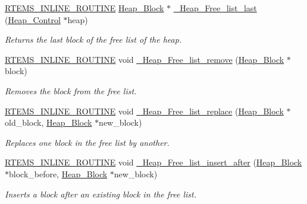 \begin{DoxyCompactItemize}
\mbox{\hyperlink{group__RTEMSScoreBaseDefs_gac216239df231d5dbd15e3520b0b9313f}{R\+T\+E\+M\+S\+\_\+\+I\+N\+L\+I\+N\+E\+\_\+\+R\+O\+U\+T\+I\+NE}} \mbox{\hyperlink{structHeap__Block}{Heap\+\_\+\+Block}} $\ast$ \mbox{\hyperlink{group__RTEMSScoreHeap_ga26aaa1feb8cf3773e5e38a13afcc4efe}{\+\_\+\+Heap\+\_\+\+Free\+\_\+list\+\_\+last}} (\mbox{\hyperlink{structHeap__Control}{Heap\+\_\+\+Control}} $\ast$heap)
\begin{DoxyCompactList}\small\item\em Returns the last block of the free list of the heap. \end{DoxyCompactList}\item 
\mbox{\hyperlink{group__RTEMSScoreBaseDefs_gac216239df231d5dbd15e3520b0b9313f}{R\+T\+E\+M\+S\+\_\+\+I\+N\+L\+I\+N\+E\+\_\+\+R\+O\+U\+T\+I\+NE}} void \mbox{\hyperlink{group__RTEMSScoreHeap_ga73da7f4190c5ae1af555374509a5e302}{\+\_\+\+Heap\+\_\+\+Free\+\_\+list\+\_\+remove}} (\mbox{\hyperlink{structHeap__Block}{Heap\+\_\+\+Block}} $\ast$block)
\begin{DoxyCompactList}\small\item\em Removes the block from the free list. \end{DoxyCompactList}\item 
\mbox{\hyperlink{group__RTEMSScoreBaseDefs_gac216239df231d5dbd15e3520b0b9313f}{R\+T\+E\+M\+S\+\_\+\+I\+N\+L\+I\+N\+E\+\_\+\+R\+O\+U\+T\+I\+NE}} void \mbox{\hyperlink{group__RTEMSScoreHeap_gade52dd12ae2cb6570271313e8bd7fdf7}{\+\_\+\+Heap\+\_\+\+Free\+\_\+list\+\_\+replace}} (\mbox{\hyperlink{structHeap__Block}{Heap\+\_\+\+Block}} $\ast$old\+\_\+block, \mbox{\hyperlink{structHeap__Block}{Heap\+\_\+\+Block}} $\ast$new\+\_\+block)
\begin{DoxyCompactList}\small\item\em Replaces one block in the free list by another. \end{DoxyCompactList}\item 
\mbox{\hyperlink{group__RTEMSScoreBaseDefs_gac216239df231d5dbd15e3520b0b9313f}{R\+T\+E\+M\+S\+\_\+\+I\+N\+L\+I\+N\+E\+\_\+\+R\+O\+U\+T\+I\+NE}} void \mbox{\hyperlink{group__RTEMSScoreHeap_ga7dd632ea52e7866d26cd025fb154387b}{\+\_\+\+Heap\+\_\+\+Free\+\_\+list\+\_\+insert\+\_\+after}} (\mbox{\hyperlink{structHeap__Block}{Heap\+\_\+\+Block}} $\ast$block\+\_\+before, \mbox{\hyperlink{structHeap__Block}{Heap\+\_\+\+Block}} $\ast$new\+\_\+block)
\begin{DoxyCompactList}\small\item\em Inserts a block after an existing block in the free list. \end{DoxyCompactList}\item 

\end{DoxyCompactItemize}

